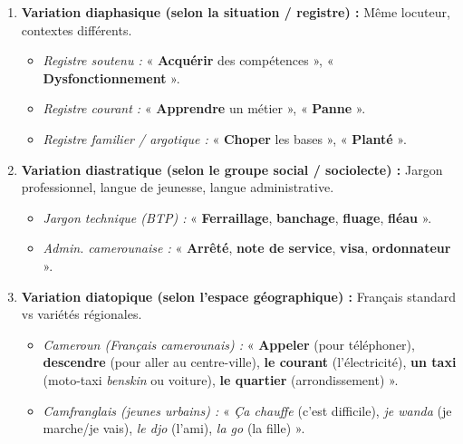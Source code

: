 \documentclass[11pt]{article}
\newcommand{\cle}[1]{{\popxbold\color{popdark}#1}}
\begin{document}
\begin{propriete}
\begin{enumerate}
    \item \textbf{Variation \cle{diaphasique} (selon la situation / registre) :} Même locuteur, contextes différents.
    \begin{itemize}
        \item \emph{Registre soutenu :} « \textbf{Acquérir} des compétences », « \textbf{Dysfonctionnement} ».
        \item \emph{Registre courant :} « \textbf{Apprendre} un métier », « \textbf{Panne} ».
        \item \emph{Registre familier / argotique :} « \textbf{Choper} les bases », « \textbf{Planté} ».
    \end{itemize}
    \item \textbf{Variation \cle{diastratique} (selon le groupe social / sociolecte) :} Jargon professionnel, langue de jeunesse, langue administrative.
    \begin{itemize}
        \item \emph{Jargon technique (BTP) :} « \textbf{Ferraillage}, \textbf{banchage}, \textbf{fluage}, \textbf{fléau} ».
        \item \emph{Admin. camerounaise :} « \textbf{Arrêté}, \textbf{note de service}, \textbf{visa}, \textbf{ordonnateur} ».
    \end{itemize}
    \item \textbf{Variation \cle{diatopique} (selon l'espace géographique) :} Français standard vs variétés régionales.
    \begin{itemize}
        \item \emph{Cameroun (Français camerounais) :} « \textbf{Appeler} (pour téléphoner), \textbf{descendre} (pour aller au centre-ville), \textbf{le courant} (l'électricité), \textbf{un taxi} (moto-taxi \emph{benskin} ou voiture), \textbf{le quartier} (arrondissement) ».
        \item \emph{Camfranglais (jeunes urbains) :} « \emph{Ça chauffe} (c'est difficile), \emph{je wanda} (je marche/je vais), \emph{le djo} (l'ami), \emph{la go} (la fille) ».
    \end{itemize}
\end{enumerate}
\end{propriete}
\end{document}
